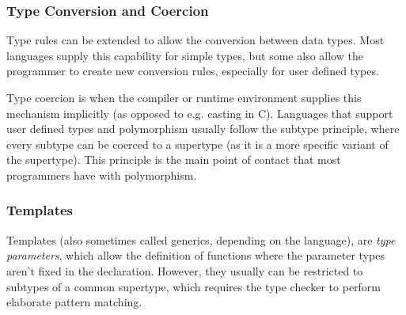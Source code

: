 \documentclass{article}
\begin{document}
\subsubsection{Type Conversion and Coercion}
Type rules can be extended to allow the conversion between data types.
Most languages supply this capability for simple types, but some also allow the programmer to create new conversion rules, especially for user defined types.

Type coercion is when the compiler or runtime environment supplies this mechanism implicitly (as opposed to e.g. casting in C).
Languages that support user defined types and polymorphism usually follow the subtype principle, where every subtype can be coerced to a supertype (as it is a more specific variant of the supertype).
This principle is the main point of contact that most programmers have with polymorphism.

\subsubsection{Templates}
Templates (also sometimes called generics, depending on the language), are \emph{type parameters}, which allow the definition of functions where the parameter types aren't fixed in the declaration.
However, they usually can be restricted to subtypes of a common supertype, which requires the type checker to perform elaborate pattern matching.
\end{document}

